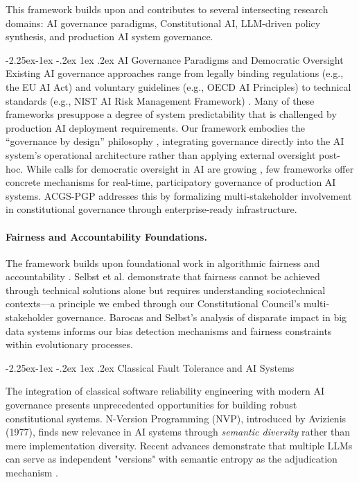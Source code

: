 \documentclass[manuscript,screen,9pt]{acmart}
\makeatletter
\renewcommand\subsection{\@startsection{subsection}{2}{\z@}%
  {-2.25ex\@plus -1ex \@minus -.2ex}%
  {1ex \@plus .2ex}%
  {\normalfont\large\bfseries}}
\makeatother
\begin{document}
This framework builds upon and contributes to several intersecting research domains: AI governance paradigms, Constitutional AI, LLM-driven policy synthesis, and production AI system governance.

\subsection{AI Governance Paradigms and Democratic Oversight}
Existing AI governance approaches range from legally binding regulations (e.g., the EU AI Act) and voluntary guidelines (e.g., OECD AI Principles) to technical standards (e.g., NIST AI Risk Management Framework) \cite{Wynants2025ETHICAL, WorldBank2024AIGovernance, CambridgeUP2024CorporateGovernance}. Many of these frameworks presuppose a degree of system predictability that is challenged by production AI deployment requirements. Our framework embodies the ``governance by design'' philosophy \cite{Engin2025AdaptiveAIGovernance}, integrating governance directly into the AI system's operational architecture rather than applying external oversight post-hoc. While calls for democratic oversight in AI are growing \cite{Hwang2025PublicCAI}, few frameworks offer concrete mechanisms for real-time, participatory governance of production AI systems. ACGS-PGP addresses this by formalizing multi-stakeholder involvement in constitutional governance through enterprise-ready infrastructure.

\paragraph{Fairness and Accountability Foundations.} The framework builds upon foundational work in algorithmic fairness and accountability \cite{Selbst2019FairnessAccountability, Barocas2016BigDataDisparate}. Selbst et al. demonstrate that fairness cannot be achieved through technical solutions alone but requires understanding sociotechnical contexts---a principle we embed through our Constitutional Council's multi-stakeholder governance. Barocas and Selbst's analysis of disparate impact in big data systems informs our bias detection mechanisms and fairness constraints within evolutionary processes.

\subsection{Classical Fault Tolerance and AI Systems}
\label{subsec:classical_fault_tolerance}

The integration of classical software reliability engineering with modern AI governance presents unprecedented opportunities for building robust constitutional systems. N-Version Programming (NVP), introduced by Avizienis (1977), finds new relevance in AI systems through \textit{semantic diversity} rather than mere implementation diversity. Recent advances demonstrate that multiple LLMs can serve as independent "versions" with semantic entropy as the adjudication mechanism \cite{Kuhn2023SemanticEntropy}.
\end{document}
